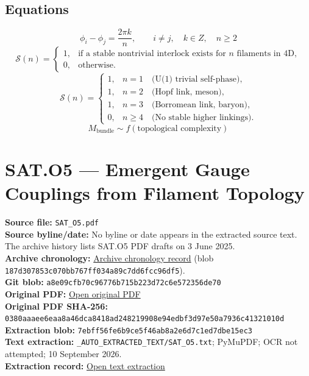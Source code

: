 \documentclass[11pt]{article}
\begin{document}
\subsection*{Equations}
\begin{equation*}
 \phi_i-\phi_j=\frac{2\pi k}{n},\qquad i\ne j,\quad k\in Z,\quad n\geq2
\end{equation*}
\begin{equation*}
 \mathcal{S}(n)=
 \begin{cases}
 1, & \text{if a stable nontrivial interlock exists for }n\text{ filaments in 4D},\\
 0, & \text{otherwise}.
 \end{cases}
\end{equation*}
\begin{equation*}
 \mathcal{S}(n)=
 \begin{cases}
 1, & n=1\quad\text{(U(1) trivial self-phase)},\\
 1, & n=2\quad\text{(Hopf link, meson)},\\
 1, & n=3\quad\text{(Borromean link, baryon)},\\
 0, & n\geq4\quad\text{(No stable higher linkings)}.
 \end{cases}
\end{equation*}
\begin{equation*}
 M_{\mathrm{bundle}}\sim f(\text{topological complexity})
\end{equation*}

\clearpage
\section*{SAT.O5 --- Emergent Gauge Couplings from Filament Topology}

\textbf{Source file:} \texttt{SAT\_O5.pdf}\\
\textbf{Source byline/date:} No byline or date appears in the extracted source text. The archive history lists SAT.O5 PDF drafts on 3 June 2025.\\
\textbf{Archive chronology:} \href{https://github.com/Satobloc/SAT_THEORY_ARCHIVE_2023-25/blob/main/SAT_HISTORY_ROUNDUP.txt}{Archive chronology record} (blob \texttt{187d307853c070bb767ff034a89c7dd6fcc96df5}).\\
\textbf{Git blob:} \texttt{a8e09cfb70c96776b715b223d72c6e572356de70}\\
\textbf{Original PDF:} \href{https://github.com/Satobloc/SAT_THEORY_ARCHIVE_2023-25/blob/main/SAT_O5.pdf}{Open original PDF}\\
\textbf{Original PDF SHA-256:} \texttt{0380aaaee6eaa8a46dca8418ad248219908e94edbf3d97e50a7936c41321010d}\\
\textbf{Extraction blob:} \texttt{7ebff56fe6b9ce5f46ab8a2e6d7c1ed7dbe15ec3}\\
\textbf{Text extraction:} \texttt{\_AUTO\_EXTRACTED\_TEXT/SAT\_O5.txt}; PyMuPDF; OCR not attempted; 10 September 2026.\\
\textbf{Extraction record:} \href{https://github.com/Satobloc/SAT_THEORY_ARCHIVE_2023-25/blob/main/_AUTO_EXTRACTED_TEXT/SAT_O5.txt}{Open text extraction}
\end{document}
